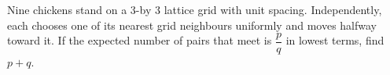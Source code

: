 Nine chickens stand on a 3-by 3 lattice grid with unit spacing. Independently, each chooses one of its nearest grid neighbours uniformly and moves halfway toward it. If the expected number of pairs that meet is $\dfrac{p}{q}$ in lowest terms, find $p+q$.
